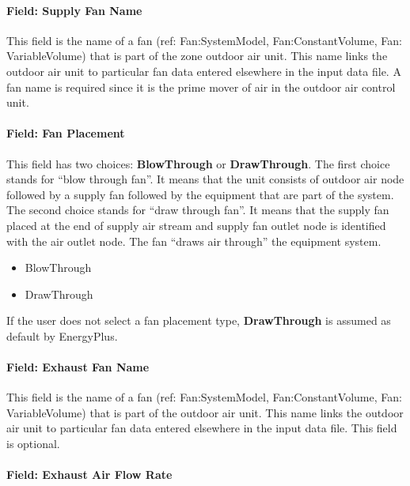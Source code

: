 \paragraph{Field: Supply Fan Name}\label{field-supply-fan-name-000}

This field is the name of a fan (ref: Fan:SystemModel, Fan:ConstantVolume, Fan: VariableVolume) that is part of the zone outdoor air unit. This name links the outdoor air unit to particular fan data entered elsewhere in the input data file. A fan name is required since it is the prime mover of air in the outdoor air control unit.

\paragraph{Field: Fan Placement}\label{field-fan-placement-1-001}

This field has two choices: \textbf{BlowThrough} or \textbf{DrawThrough}. The first choice stands for ``blow through fan''. It means that the unit consists of outdoor air node followed by a supply fan followed by the equipment that are part of the system. The second choice stands for ``draw through fan''. It means that the supply fan placed at the end of supply air stream and supply fan outlet node is identified with the air outlet node. The fan ``draws air through'' the equipment system.

\begin{itemize}
\item
  BlowThrough
\item
  DrawThrough
\end{itemize}

If the user does not select a fan placement type, \textbf{DrawThrough} is assumed as default by EnergyPlus.

\paragraph{Field: Exhaust Fan Name}\label{field-exhaust-fan-name}

This field is the name of a fan (ref: Fan:SystemModel, Fan:ConstantVolume, Fan: VariableVolume) that is part of the outdoor air unit. This name links the outdoor air unit to particular fan data entered elsewhere in the input data file. This field is optional.

\paragraph{Field: Exhaust Air Flow Rate}\label{field-exhaust-air-flow-rate}

